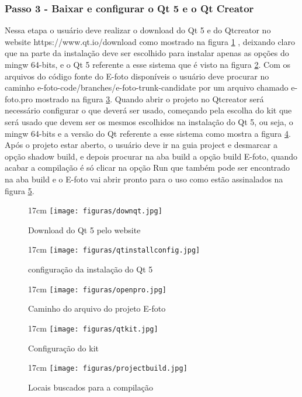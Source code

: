  \subsubsection{Passo 3 - Baixar e configurar o Qt 5 e o Qt Creator}
 Nessa etapa o usuário deve realizar o download do Qt 5 e do Qtcreator no website https://www.qt.io/download como mostrado na figura \ref{fig:downqt} , deixando claro que na parte da instalação deve ser escolhido para instalar apenas as opções do mingw 64-bits, e o Qt 5 referente a esse sistema que é visto na figura \ref{fig:qtinstallconfig}. Com os arquivos do código fonte do E-foto disponíveis o usuário deve procurar no caminho e-foto-code/branches/e-foto-trunk-candidate por um arquivo chamado e-foto.pro mostrado na figura \ref{fig:openpro}. Quando abrir o projeto no Qtcreator será necessário configurar o que deverá ser usado, começando pela escolha do kit que será usado que devem ser os mesmos escolhidos na instalação do Qt 5, ou seja, o mingw 64-bits e a versão do Qt referente a esse sistema como mostra a figura \ref{fig:qtkit}. Após o projeto estar aberto, o usuário deve ir na guia project e desmarcar a opção shadow build, e depois procurar na aba build a opção build E-foto, quando acabar a compilação é só clicar na opção Run que também pode ser encontrado na aba build e o E-foto vai abrir pronto para o uso como estão assinalados na figura \ref{fig:projectbuild}.
  \begin{figure}[!ht]{17cm}
 	\texttt{[image: figuras/downqt.jpg]}
 	\caption{Download do Qt 5 pelo website} \label{fig:downqt}
 \end{figure}

 \begin{figure}[!ht]{17cm}
	\texttt{[image: figuras/qtinstallconfig.jpg]}
	\caption{configuração da  instalação do Qt 5} \label{fig:qtinstallconfig}
\end{figure}

 \begin{figure}[!ht]{17cm}
	\texttt{[image: figuras/openpro.jpg]}
	\caption{Caminho do arquivo do projeto E-foto} \label{fig:openpro}
\end{figure}

 \begin{figure}[!ht]{17cm}
	\texttt{[image: figuras/qtkit.jpg]}
	\caption{Configuração do kit} \label{fig:qtkit}
\end{figure}

 \begin{figure}[!ht]{17cm}
	\texttt{[image: figuras/projectbuild.jpg]}
	\caption{Locais buscados para a compilação} \label{fig:projectbuild}
\end{figure}
 